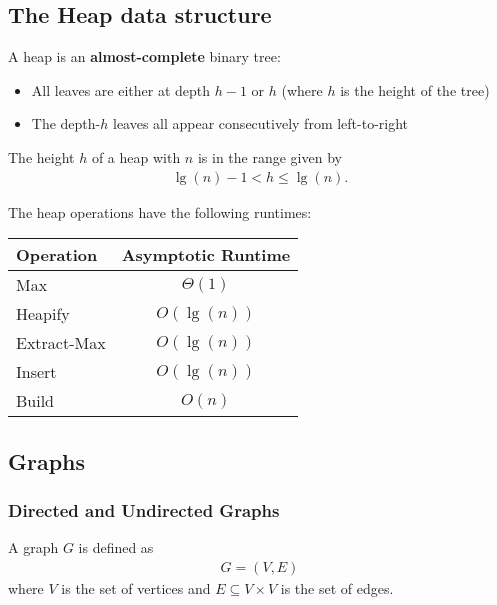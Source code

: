 \documentclass{article}
\begin{document}
\subsection{The Heap data structure}


\begin{definition}
	A heap is an \textbf{almost-complete} binary tree:
	\begin{itemize}
		\item All leaves are either at depth $h-1$ or $h$ (where $h$ is the height of the tree)
		\item The depth-$h$ leaves all appear consecutively from left-to-right
	\end{itemize}
\end{definition}
\begin{lemma}
	The height $h$ of a heap with $n$ is in the range given by
	\begin{align*}
		\lg(n)-1 < h \leq \lg(n).
	\end{align*}
\end{lemma}
\begin{theorem}
	The heap operations have the following runtimes:
	\\
	\begin{center}
	\begin{tabular}{| l | c |}
		\hline
		Operation & Asymptotic Runtime\\
		\hline
		Max & $\Theta(1)$\\
		\hline
		Heapify & $O(\lg(n))$\\
		\hline
		Extract-Max & $O(\lg(n))$\\
		\hline
		Insert & $O(\lg(n))$\\
		\hline
		Build & $O(n)$\\
		\hline
	\end{tabular}
	\end{center}
\end{theorem}


\subsection{Graphs}


\subsubsection{Directed and Undirected Graphs}

\begin{definition}
	A graph $G$ is defined as
	\begin{align*}
		G = (V,E)
	\end{align*}
	where $V$ is the set of vertices and $E\subseteq V\times V$ is the set of edges.
\end{definition}
\end{document}
